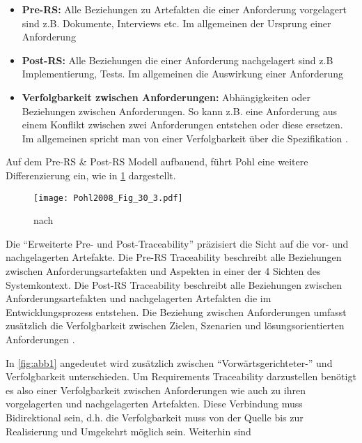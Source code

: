 \begin{itemize}
    \item \textbf{Pre-RS:} Alle Beziehungen zu Artefakten die einer Anforderung vorgelagert sind z.B. Dokumente, Interviews etc. Im allgemeinen der Ursprung einer Anforderung
    \item \textbf{Post-RS:} Alle Beziehungen die einer Anforderung nachgelagert sind z.B Implementierung, Tests. Im allgemeinen die Auswirkung einer Anforderung
    \item \textbf{Verfolgbarkeit zwischen Anforderungen:} Abhängigkeiten oder Beziehungen zwischen Anforderungen. So kann z.B. eine Anforderung aus einem Konflikt zwischen zwei Anforderungen entstehen oder diese ersetzen. Im allgemeinen spricht man von einer Verfolgbarkeit über die Spezifikation \cite{Pohl2015BasiswissenIREB-Standard}.
\end{itemize}

Auf dem Pre-RS \& Post-RS Modell aufbauend, führt Pohl eine weitere Differenzierung ein, wie in \ref{fig:abb2} dargestellt.

\begin{figure}[!htb]
  \centering
  \texttt{[image: Pohl2008\_Fig\_30\_3.pdf]}
  \caption{nach \cite[Fig. 30.3]{Pohl2008RequirementsTechniken}}
  \label{fig:abb2}
\end{figure}

Die \enquote{Erweiterte Pre- und Post-Traceability} präzisiert die Sicht auf die vor- und nachgelagerten Artefakte. Die Pre-RS Traceability beschreibt alle Beziehungen zwischen Anforderungsartefakten und Aspekten in einer der 4 Sichten des Systemkontext. Die Post-RS Traceability beschreibt alle Beziehungen zwischen Anforderungsartefakten und nachgelagerten Artefakten die im Entwicklungsprozess entstehen. Die Beziehung zwischen Anforderungen umfasst zusätzlich die Verfolgbarkeit zwischen Zielen, Szenarien und lösungsorientierten Anforderungen \cite{Pohl2008RequirementsTechniken}.

In \ref{fig:abb1} angedeutet wird zusätzlich zwischen \enquote{Vorwärtsgerichteter-} und  Verfolgbarkeit unterschieden. Um Requirements Traceability darzustellen benötigt es also einer Verfolgbarkeit zwischen Anforderungen wie auch zu ihren vorgelagerten und nachgelagerten Artefakten. Diese Verbindung muss Bidirektional sein, d.h. die Verfolgbarkeit muss von der Quelle bis zur Realisierung und Umgekehrt möglich sein. Weiterhin sind 



